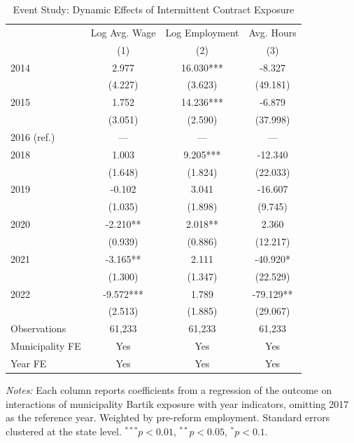 \begin{table}[htbp]
\centering
\caption{Event Study: Dynamic Effects of Intermittent Contract Exposure}
\label{tab:eventstudy}
\begin{tabular}{lccc}
\hline\hline
 & Log Avg. Wage & Log Employment & Avg. Hours \\
 & (1) & (2) & (3) \\
\hline
2014 & 2.977 & 16.030*** & -8.327 \\
 & (4.227) & (3.623) & (49.181) \\
2015 & 1.752 & 14.236*** & -6.879 \\
 & (3.051) & (2.590) & (37.998) \\
2016 (ref.) & --- & --- & --- \\
2018 & 1.003 & 9.205*** & -12.340 \\
 & (1.648) & (1.824) & (22.033) \\
2019 & -0.102 & 3.041 & -16.607 \\
 & (1.035) & (1.898) & (9.745) \\
2020 & -2.210** & 2.018** & 2.360 \\
 & (0.939) & (0.886) & (12.217) \\
2021 & -3.165** & 2.111 & -40.920* \\
 & (1.300) & (1.347) & (22.529) \\
2022 & -9.572*** & 1.789 & -79.129** \\
 & (2.513) & (1.885) & (29.067) \\
\hline
Observations & 61,233 & 61,233 & 61,233 \\
Municipality FE & Yes & Yes & Yes \\
Year FE & Yes & Yes & Yes \\
\hline\hline
\end{tabular}
\begin{tablenotes}
\item \textit{Notes:} Each column reports coefficients from a regression of the outcome on interactions of municipality Bartik exposure with year indicators, omitting 2017 as the reference year. Weighted by pre-reform employment. Standard errors clustered at the state level. $^{***}p<0.01$, $^{**}p<0.05$, $^{*}p<0.1$.
\end{tablenotes}
\end{table}

